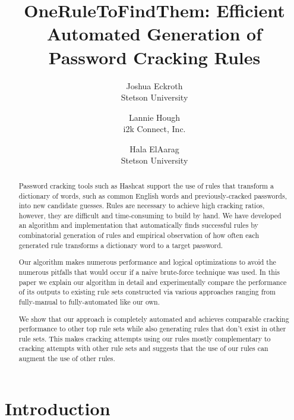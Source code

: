 \documentclass[letterpaper,twocolumn,10pt]{article}
\begin{document}
\date{}

\title{\Large \bf OneRuleToFindThem: Efficient Automated Generation of Password Cracking Rules}

\author{
{\rm Joshua Eckroth}\\
Stetson University
\and
{\rm Lannie Hough}\\
i2k Connect, Inc.
\and
{\rm Hala ElAarag}\\
Stetson University
}

\maketitle

\begin{abstract}
Password cracking tools such as Hashcat support the use of rules that transform
a dictionary of words, such as common English words and previously-cracked
passwords, into new candidate guesses. Rules are necessary to achieve high
cracking ratios, however, they are difficult and time-consuming to build by hand. We have
developed an algorithm and implementation that automatically finds successful
rules by combinatorial generation of rules and empirical observation of how
often each generated rule transforms a dictionary word to a target password.

Our algorithm makes numerous performance and logical optimizations to avoid the
numerous pitfalls that would occur if a naive brute-force technique was used.  In this
paper we explain our algorithm in detail and experimentally compare the performance of
its outputs to existing rule sets constructed via various approaches ranging from
fully-manual to fully-automated like our own.

We show that our approach is completely automated and achieves comparable
cracking performance to other top rule sets while also generating rules
that don't exist in other rule sets. This makes cracking attempts using our
rules mostly complementary to cracking attempts with other rule sets and
suggests that the use of our rules can augment the use of other rules.

\end{abstract}


\section{Introduction}
\end{document}

